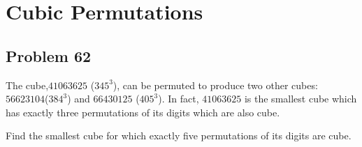 \chapter{Cubic Permutations}
\section{Problem 62}
The cube,$41063625$ ($345^3$), can be permuted to produce two other cubes: 
 $56623104$($384^3$) and $66430125$ ($405^3$). In fact, $41063625$ is the smallest cube which has exactly three
 permutations of its digits which are also cube.

Find the smallest cube for which exactly five permutations of its digits are cube.
